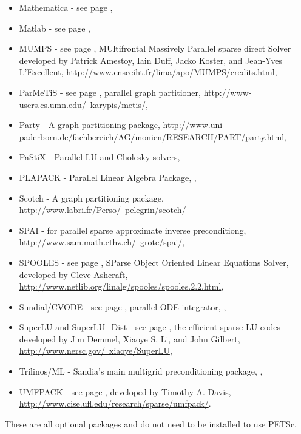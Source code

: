 \begin{itemize}
  \item Mathematica -  see page \pageref{ch_mathematica},
  \item Matlab -      see page \pageref{ch_matlab},
  \item MUMPS -      see page \pageref{sec_externalsol}, MUltifrontal Massively Parallel sparse direct Solver developed by Patrick Amestoy, 
                     Iain Duff, Jacko Koster, and Jean-Yves L'Excellent,
                     \href{http://www.enseeiht.fr/lima/apo/MUMPS/credits.html}{http://www.enseeiht.fr/lima/apo/MUMPS/credits.html},
  \item ParMeTiS -     see page \pageref{sec_partitioning}, parallel graph partitioner,
                     \href{http://www-users.cs.umn.edu/~karypis/metis/}{http://www-users.cs.umn.edu/~karypis/metis/},
  \item Party -     A graph partitioning package, \href{http://www.uni-paderborn.de/fachbereich/AG/monien/RESEARCH/PART/party.html}{http://www.uni-paderborn.de/fachbereich/AG/monien/RESEARCH/PART/party.html},
  \item PaStiX -     Parallel LU and Cholesky solvers,
  \item PLAPACK - Parallel Linear Algebra Package, \href{http://www.cs.utexas.edu/users/plapack/},
  \item Scotch -     A graph partitioning package, \href{http://www.labri.fr/Perso/~pelegrin/scotch/}{http://www.labri.fr/Perso/~pelegrin/scotch/}
  \item SPAI -        for parallel sparse approximate inverse preconditiong, 
                     \href{http://www.sam.math.ethz.ch/~grote/spai/}{http://www.sam.math.ethz.ch/~grote/spai/},
  \item SPOOLES - see page \pageref{sec_externalsol}, SParse Object Oriented Linear Equations Solver, developed by Cleve Ashcraft, 
                    \href{http://www.netlib.org/linalg/spooles/spooles.2.2.html}{http://www.netlib.org/linalg/spooles/spooles.2.2.html},
  \item Sundial/CVODE - see page \pageref{sec_pvode}, parallel ODE integrator,
                     \href{http://www.llnl.gov/CASC/sundials/},
  \item SuperLU and SuperLU\_Dist - see page \pageref{sec_externalsol}, 
                    the efficient sparse LU codes developed by Jim Demmel,  Xiaoye S. Li, and John Gilbert, 
                    \href{http://www.nersc.gov/~xiaoye/SuperLU}{http://www.nersc.gov/~xiaoye/SuperLU},
  \item Trilinos/ML - Sandia's main multigrid preconditioning package, \href{http://software.sandia.gov/trilinos/},
  \item UMFPACK - see page \pageref{sec_externalsol}, 
                    developed by Timothy A. Davis, 
                    \href{http://www.cise.ufl.edu/research/sparse/umfpack/}{http://www.cise.ufl.edu/research/sparse/umfpack/}.
\end{itemize}
These are all optional packages and do not need to be installed to use PETSc.

